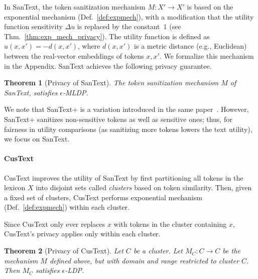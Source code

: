 \documentclass[11pt]{article}
\newtheorem{theorem}{Theorem}
\newtheorem{corollary}{Corollary}
\begin{document}
In SanText,
the token sanitization mechanism $M:X' \rightarrow X'$ is  based on the exponential mechanism (Def.~\ref{def:expmech}), with a modification that the utility function sensitivity \( \Delta u \) is replaced by the constant~\( 1 \) (see Thm.~\ref{thm:exp_mech_privacy}). The utility function is defined as $u(x, x') = -d(x, x')$, where $d(x, x')$ is a metric distance (e.g., Euclidean) between the real-vector embeddings of tokens $x, x'$. We formalize this mechanism in the Appendix.
SanText achieves the following privacy guarantee.

\begin{theorem}[Privacy of SanText]
    The token sanitization mechanism \( M \) of SanText, satisfies \( \epsilon \)-MLDP.
\end{theorem}


We note that SanText+ is a variation introduced in the same paper~\cite{yue2021differential}. However, SanText+ sanitizes non-sensitive tokens as well as sensitive ones; thus, for fairness in utility comparisons (as sanitizing more tokens lowers the text utility), we focus on SanText. 

\paragraph{CusText~\cite{chen2023customized}}
\label{sec:custext}

CusText improves the utility of SanText by first partitioning all tokens in the lexicon $X$ into disjoint sets called {\em clusters} based on token similarity. 
Then, given a fixed set of clusters, CusText performs exponential mechanism (Def.~\ref{def:expmech}) within each cluster. 


Since CusText only ever replaces $x$ with tokens in the cluster containing $x$, CusText's privacy applies only within each cluster. 

\begin{theorem}[Privacy of CusText]
Let $C$ be a cluster. 
Let $M_{C}:C \rightarrow C$ be the mechanism $M$ defined above, but with domain and range restricted to cluster $C$. Then $M_{C}$ satisfies $\epsilon$-LDP.
\end{theorem}
\end{document}

